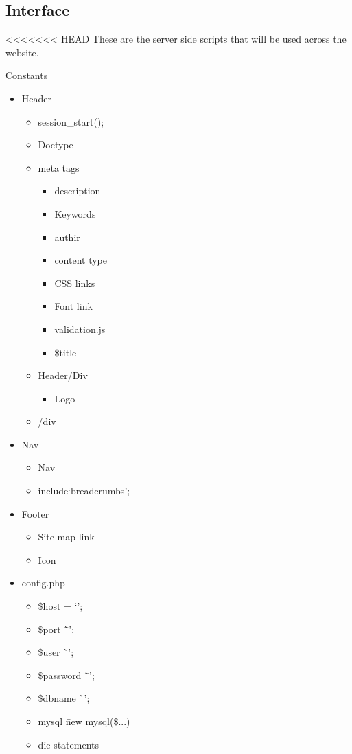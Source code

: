 \subsection{Interface}
<<<<<<< HEAD
	These are the server side scripts that will be used across the website.

	Constants
	\begin{itemize}
		\item Header
		\begin{itemize}
			\item session\_start();
			\item Doctype
			\item meta tags
			\begin{itemize}
				\item description
				\item Keywords
				\item authir
				\item content type
				\item CSS links
				\item Font link
				\item validation.js
				\item \$title
			\end{itemize}
			\item Header/Div
			\begin{itemize}
				\item Logo
			\end{itemize}
			\item /div
		\end{itemize}
		\item Nav
		\begin{itemize}
			\item Nav
			\item include`breadcrumbs';
		\end{itemize}
			
		\item Footer 
		\begin{itemize}
			\item Site map link 
			\item Icon
		\end{itemize}
			
		
		\item config.php
		\begin{itemize}
			\item \$host = `';
			\item \$port \= `';
			\item \$user \= `';
			\item \$password \= `';
			\item \$dbname \= `';
			\item mysql \= new mysql(\$...)
			\item die statements
		\end{itemize}


\end{itemize}
